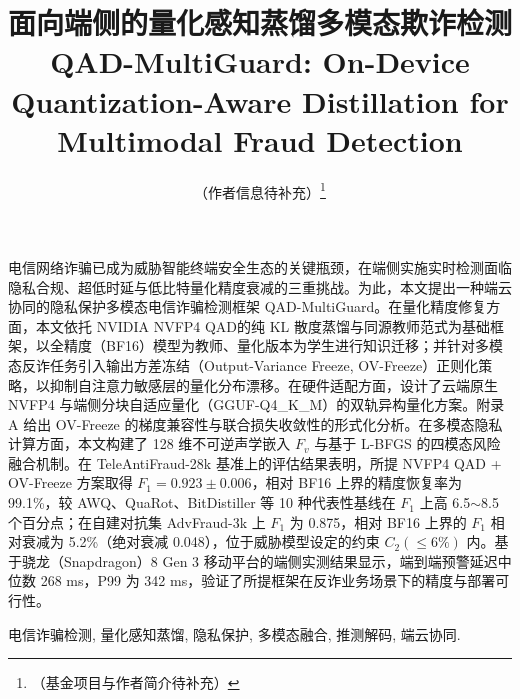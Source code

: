 \documentclass[11pt, a4paper]{article}
\title{\textbf{面向端侧的量化感知蒸馏多模态欺诈检测}}
\author{（作者信息待补充）\footnote{（基金项目与作者简介待补充）}
\date{}}
\makeatletter
\newcommand{\makefirstfootnote}{%
    \iffootnoteadded
    \else
        {\footnotetext[1]{基金项目：\@}}%
        {\footnotetext[2]{作者简介：\@authorinfo，通信作者}}%
    \footnoteaddedtrue
    \fi
}
\makeatother
\begin{document}
\maketitle
\makefirstfootnote

\thispagestyle{plain} %

电信网络诈骗已成为威胁智能终端安全生态的关键瓶颈，在端侧实施实时检测面临隐私合规、超低时延与低比特量化精度衰减的三重挑战。为此，本文提出一种端云协同的隐私保护多模态电信诈骗检测框架 QAD-MultiGuard。在量化精度修复方面，本文依托 NVIDIA NVFP4 QAD的纯 KL 散度蒸馏与同源教师范式为基础框架，以全精度（BF16）模型为教师、量化版本为学生进行知识迁移；并针对多模态反诈任务引入输出方差冻结（Output-Variance Freeze, OV-Freeze）正则化策略，以抑制自注意力敏感层的量化分布漂移。在硬件适配方面，设计了云端原生 NVFP4 与端侧分块自适应量化（GGUF-Q4\_K\_M）的双轨异构量化方案。附录 A 给出 OV-Freeze 的梯度兼容性与联合损失收敛性的形式化分析。在多模态隐私计算方面，本文构建了 128 维不可逆声学嵌入 $F_v$ 与基于 L-BFGS 的四模态风险融合机制。在 TeleAntiFraud-28k 基准上的评估结果表明，所提 NVFP4 QAD + OV-Freeze 方案取得 $F_1=0.923\pm0.006$，相对 BF16 上界的精度恢复率为 99.1\%，较 AWQ、QuaRot、BitDistiller 等 10 种代表性基线在 $F_1$ 上高 6.5$\sim$8.5 个百分点；在自建对抗集 AdvFraud-3k 上 $F_1$ 为 0.875，相对 BF16 上界的 $F_1$ 相对衰减为 5.2\%（绝对衰减 0.048），位于威胁模型设定的约束 $C_2(\le 6\%)$ 内。基于骁龙（Snapdragon）8 Gen 3 移动平台的端侧实测结果显示，端到端预警延迟中位数 268 ms，P99 为 342 ms，验证了所提框架在反诈业务场景下的精度与部署可行性。

 电信诈骗检测, 量化感知蒸馏, 隐私保护, 多模态融合, 推测解码, 端云协同.

\vspace{1em} %

\title{\centering\large\textbf{QAD-MultiGuard: On-Device Quantization-Aware Distillation for Multimodal Fraud Detection}}
\end{document}
